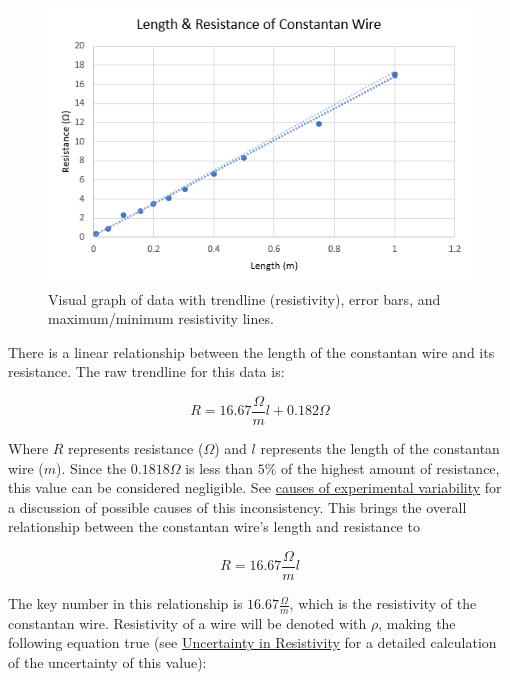 \documentclass{article}
\begin{document}
\begin{figure}
\centering
\includegraphics[width=1.0\textwidth]{graph.png}
\caption{\label{fig:graph}Visual graph of data with trendline (resistivity), error bars, and maximum/minimum resistivity lines.}
\end{figure}

There is a linear relationship between the length of the constantan wire and its resistance. The raw trendline for this data is:

\begin{equation}
    R = 16.67\frac{\Omega}{m} l + 0.182\Omega
\end{equation}

Where $R$ represents resistance ($\Omega$) and $l$ represents the length of the constantan wire ($m$). Since the \begin{math}0.1818\Omega\end{math} is less than \begin{math}5\%\end{math} of the highest amount of resistance, this value can be considered negligible. See \hyperref[sec:error]{causes of experimental variability} for a discussion of possible causes of this inconsistency. This brings the overall relationship between the constantan wire's length and resistance to 

\begin{equation}
    R = 16.67\frac{\Omega}{m} l
\end{equation}

The key number in this relationship is $16.67\frac{\Omega}{m}$, which is the resistivity of the constantan wire. Resistivity of a wire will be denoted with $\rho$, making the following equation true (see \hyperref[sec:res]{Uncertainty in Resistivity} for a detailed calculation of the uncertainty of this value): 
\end{document}
